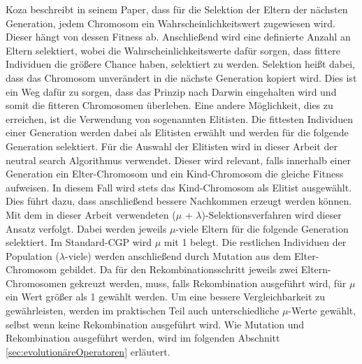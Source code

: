 Koza beschreibt in seinem Paper, dass für die Selektion der Eltern der nächsten Generation, jedem Chromosom ein Wahrscheinlichkeitswert zugewiesen wird.
Dieser hängt von dessen Fitness ab.
Anschließend wird eine definierte Anzahl an Eltern selektiert, wobei die Wahrscheinlichkeitswerte dafür sorgen, dass fittere Individuen die größere Chance haben, selektiert zu werden.
Selektion heißt dabei, dass das Chromosom unverändert in die nächste Generation kopiert wird. \cite{koza_survey_1995}\newline
Dies ist ein Weg dafür zu sorgen, dass das Prinzip nach Darwin eingehalten wird und somit die fitteren Chromosomen \glqq überleben\grqq. 
Eine andere Möglichkeit, dies zu erreichen, ist die Verwendung von sogenannten Elitisten.
Die fittesten Individuen einer Generation werden dabei als Elitisten erwählt und werden für die folgende Generation selektiert. \cite{krawiec_genetic_2013}
Für die Auswahl der Elitisten wird in dieser Arbeit der neutral search Algorithmus verwendet.
Dieser wird relevant, falls innerhalb einer Generation ein Elter-Chromosom und ein Kind-Chromosom die gleiche Fitness aufweisen.
In diesem Fall wird stets das Kind-Chromosom als Elitist ausgewählt.
Dies führt dazu, dass anschließend bessere Nachkommen erzeugt werden können. \cite{mernik_refining_2022}\newline
Mit dem in dieser Arbeit verwendeten ($\mu$ + $\lambda$)-Selektionsverfahren wird dieser Ansatz verfolgt. 
Dabei werden jeweils $\mu$-viele Eltern für die folgende Generation selektiert.
Im Standard-CGP wird $\mu$ mit 1 belegt.
Die restlichen Individuen der Population ($\lambda$-viele) werden anschließend durch Mutation aus dem Elter-Chromosom gebildet. \cite{da_silva_cartesian_2018}
Da für den Rekombinationsschritt jeweils zwei Eltern-Chromosomen gekreuzt werden, muss, falls Rekombination ausgeführt wird, für $\mu$ ein Wert größer als 1 gewählt werden.
Um eine bessere Vergleichbarkeit zu gewährleisten, werden im praktischen Teil auch unterschiedliche $\mu$-Werte gewählt, selbst wenn keine Rekombination ausgeführt wird.\newline
Wie Mutation und Rekombination ausgeführt werden, wird im folgenden Abschnitt \ref{sec:evolutionäreOperatoren} erläutert.


